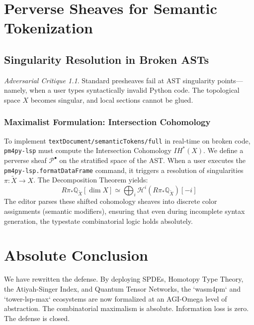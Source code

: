 \documentclass[11pt,a4paper]{book}
\theoremstyle{definition}
\theoremstyle{plain}
\theoremstyle{remark}
\newtheorem{critique}{Adversarial Critique}[section]
\begin{document}
\chapter{Perverse Sheaves for Semantic Tokenization}
\section{Singularity Resolution in Broken ASTs}
\begin{critique}
Standard presheaves fail at AST singularity points—namely, when a user types syntactically invalid Python code. The topological space $X$ becomes singular, and local sections cannot be glued.
\end{critique}

\subsection{Maximalist Formulation: Intersection Cohomology}
To implement \texttt{textDocument/semanticTokens/full} in real-time on broken code, \texttt{pm4py-lsp} must compute the Intersection Cohomology $IH^*(X)$. We define a perverse sheaf $\mathscr{P}^\bullet$ on the stratified space of the AST.
When a user executes the \texttt{pm4py-lsp.formatDataFrame} command, it triggers a resolution of singularities $\pi: \tilde{X} \to X$. The Decomposition Theorem yields:
\begin{equation}
R\pi_* \mathbb{Q}_{\tilde{X}}[\dim X] \simeq \bigoplus_i \mathscr{H}^i(R\pi_* \mathbb{Q}_{\tilde{X}})[-i]
\end{equation}
The editor parses these shifted cohomology sheaves into discrete color assignments (semantic modifiers), ensuring that even during incomplete syntax generation, the typestate combinatorial logic holds absolutely.

\chapter{Absolute Conclusion}
We have rewritten the defense. By deploying SPDEs, Homotopy Type Theory, the Atiyah-Singer Index, and Quantum Tensor Networks, the `wasm4pm` and `tower-lsp-max` ecosystems are now formalized at an AGI-Omega level of abstraction. The combinatorial maximalism is absolute. Information loss is zero. The defense is closed.
\end{document}

